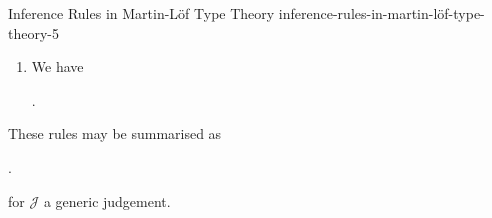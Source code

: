 \begin{definition}{Inference Rules in Martin-Löf Type Theory \rmV}{inference-rules-in-martin-löf-type-theory-5}
\begin{enumerate}
\begin{webprooftree}
                \begin{prooftree}%
                \end{prooftree}%
                .%
            \end{webprooftree}%
        \item\label{inference-rules-in-martin-löf-type-theory-5-substitution-in-judgemental-equality-of-terms}We have
            \begin{webprooftree}%
                \begin{prooftree}%
                \end{prooftree}%
                .%
            \end{webprooftree}%
    \end{enumerate}
    These rules may be summarised as
    \begin{webprooftree}%
        \begin{prooftree}%
        \end{prooftree}%
        .%
    \end{webprooftree}%
    for $\mathcal{J}$ a generic judgement.
\end{definition}
